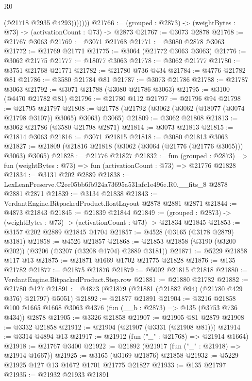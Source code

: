 \begin{lexlean}{R0}
\begin{coremodule}
                (@21718 @2935 @4293)))))))
@21766 := (grouped : @2873) -> (weightBytes : @73) -> (activationCount : @73) -> @2873
@21767 := @3073 @2878
@21768 := @21767 @3063
@21769 := @3071 @21768
@21771 := @3080 @2878 @3063
@21772 := @21769 @21771
@21775 := @3064 (@21772 @3063 @3063)
@21776 := @3062 @21775
@21777 := @18077 @3063
@21778 := @3062 @21777
@21780 := @3751 @21768 @21771
@21782 := @21780 @736 @434
@21784 := @4776 @21782 @81
@21786 := @3580 @21784 @81
@21787 := @3073 @21786
@21788 := @21787 @3063
@21792 := @3071 @21788 (@3080 @21786 @3063)
@21795 := @3100 (@4470 @21782 @81)
@21796 := @21780 @112
@21797 := @21796 @94
@21798 := @21795 @21797
@21808 := @21778 (@21792 (@3062 (@3062 (@18077 (@3074 @21798 @3107)) @3065) @3063) @3065)
@21809 := @3062 @21808
@21813 := @3062 @21786 (@3580 @21798 @2871)
@21814 := @3073 @21813
@21815 := @21814 @3063
@21816 := @3071 @21815
@21818 := @3080 @21813 @3063
@21827 := @21809 (@21816 @21818 (@3062 (@3064 (@21776 (@21776 @3065))) @3063) @3065)
@21828 := @21776 @21827
@21832 := fun (grouped : @2873) =>
  fun (weightBytes : @73) => fun (activationCount : @73) => @21776 @21828
@21834 := @3131 @202 @2889
@21838 := LexLeanPreserve.C2ee05bb6fb924a73695a531afc1e496e.R0.__fits_8 @2878 @2881 @2871
@21839 := @3134 @21838
@21843 := VerdantEngine.BitpackedProduct.floatLayout @2878 @2881 @2871
@21844 := @4873 @21843
@21845 := @21839 @21844
@21849 := (grouped : @2873) -> (weightBytes : @73) -> (activationCount : @73) -> @21834 @21845
@21853 := @3157 @202 @2889 @21845 @1704
@21857 := @4528 (@3165 (@3178 @2879) @3181)
@21858 := @4526 @21857
@21868 := @21853 @21858 (@3190 (@3200 @202)) (@3206 (@3207 (@3208 @1704) @2889 @3181))
@21871 := @5229 @21858 @117 @13
@21875 := @21871 @1669 @1702 @21775 @21828
@21876 := @135 @21782
@21877 := @21875 @21876
@21879 := @5002 @21815 @21818
@21880 := VerdantEngine.BitpackedProduct.Step.row
@21881 := @21880 @21782
@21882 := @21780 @127
@21891 := @4873 (@21879 (@21881 (@21882 @94) (@21780 @429 @376) @21797) @5051)
@21892 := @21877 @21891
@21904 := @3216
    @21858
    @100
    @1665
    @1668
    @3063
    @4376
    (fun (__b : @2873) => @135 (@3753 @736 @434))
    @2878
@21905 := @3326 @21858
@21907 := @21905 @81 @2879
@21908 := @3332 @21858
@21912 := @21904 (@21907 (@3331 (@21908 @81)))
@21914 := @3314 @4894 @13
@21917 := @21912 (fun ("_" : @21768) => @21914 @1664)
@21918 := @21767 @3400
@21922 := @21892 (@21917 (fun ("_" : @21918) => @21914 @1667))
@21925 := @3165 (@3169 @21876) @21858
@21932 := @5229 @21925 @127 @13 @1672 @1701 @21775 @21827
@21933 := @135 @21797
@21935 := @21932 @21933 @21891

\end{coremodule}
\end{lexlean}
